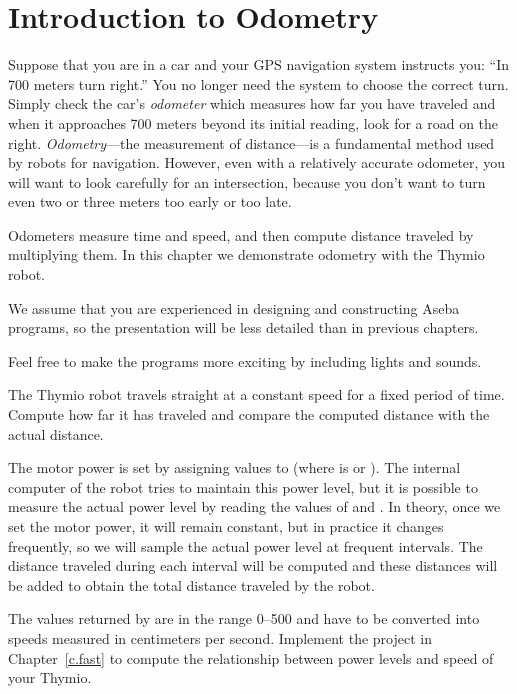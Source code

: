 
\chapter{Introduction to Odometry}

Suppose that you are in a car and your GPS navigation system
instructs you: ``In 700 meters turn right.'' You no longer need the
system to choose the correct turn. Simply check the car's
\emph{odometer} which measures how far you have traveled and when it
approaches 700 meters beyond its initial reading, look for a road
on the right. \emph{Odometry}---the measurement of distance---is a
fundamental method used by robots for navigation.
However, even with a relatively accurate odometer, you will
want to look carefully for an intersection, because you don't want to
turn even two or three meters too early or too late.

Odometers measure time and speed,
and then compute distance traveled by multiplying them. In
this chapter we demonstrate odometry with the Thymio robot.

We assume that you are experienced in designing and constructing
Aseba programs, so the presentation will be less detailed
than in previous chapters.

Feel free to make the programs more exciting by including lights
and sounds.


The Thymio robot travels straight at a constant speed for a fixed
period of time. Compute how far it has traveled and compare the
computed distance with the actual distance.


The motor power is set by assigning values to
 (where  is  or ). The internal
computer of the robot tries to maintain this power level, but it is
possible to measure the actual power level by reading the values of
 and . In theory, once we set
the motor power, it will remain constant, but in practice it changes
frequently, so we will sample the actual power level at frequent
intervals. The distance traveled during each interval will be computed
and these distances will be added to obtain the total distance
traveled by the robot.

The values returned by  are in the range 0--500 and
have to be converted into speeds measured in centimeters per second.
Implement the project in Chapter~\ref{c.fast}
to compute the relationship between
power levels and speed of your Thymio.

